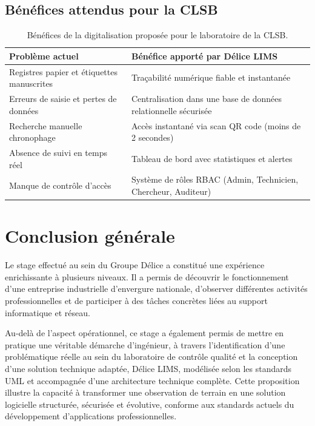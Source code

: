 \documentclass[12pt,a4paper,oneside]{report}
\begin{document}
\section{Bénéfices attendus pour la CLSB}
\begin{table}[H]\centering
\begin{tabular}{|p{5cm}|p{8cm}|}
\hline
\textbf{Problème actuel} & \textbf{Bénéfice apporté par Délice LIMS} \\
\hline
Registres papier et étiquettes manuscrites & Traçabilité numérique fiable et instantanée \\
\hline
Erreurs de saisie et pertes de données & Centralisation dans une base de données relationnelle sécurisée \\
\hline
Recherche manuelle chronophage & Accès instantané via scan QR code (moins de 2 secondes) \\
\hline
Absence de suivi en temps réel & Tableau de bord avec statistiques et alertes \\
\hline
Manque de contrôle d'accès & Système de rôles RBAC (Admin, Technicien, Chercheur, Auditeur) \\
\hline
\end{tabular}
\caption{Bénéfices de la digitalisation proposée pour le laboratoire de la CLSB.}
\end{table}

\chapter*{Conclusion générale}
Le stage effectué au sein du Groupe Délice a constitué une expérience enrichissante à plusieurs niveaux. Il a permis de découvrir le fonctionnement d'une entreprise industrielle d'envergure nationale, d'observer différentes activités professionnelles et de participer à des tâches concrètes liées au support informatique et réseau.

Au-delà de l'aspect opérationnel, ce stage a également permis de mettre en pratique une véritable démarche d'ingénieur, à travers l'identification d'une problématique réelle au sein du laboratoire de contrôle qualité et la conception d'une solution technique adaptée, Délice LIMS, modélisée selon les standards UML et accompagnée d'une architecture technique complète. Cette proposition illustre la capacité à transformer une observation de terrain en une solution logicielle structurée, sécurisée et évolutive, conforme aux standards actuels du développement d'applications professionnelles.
\end{document}
